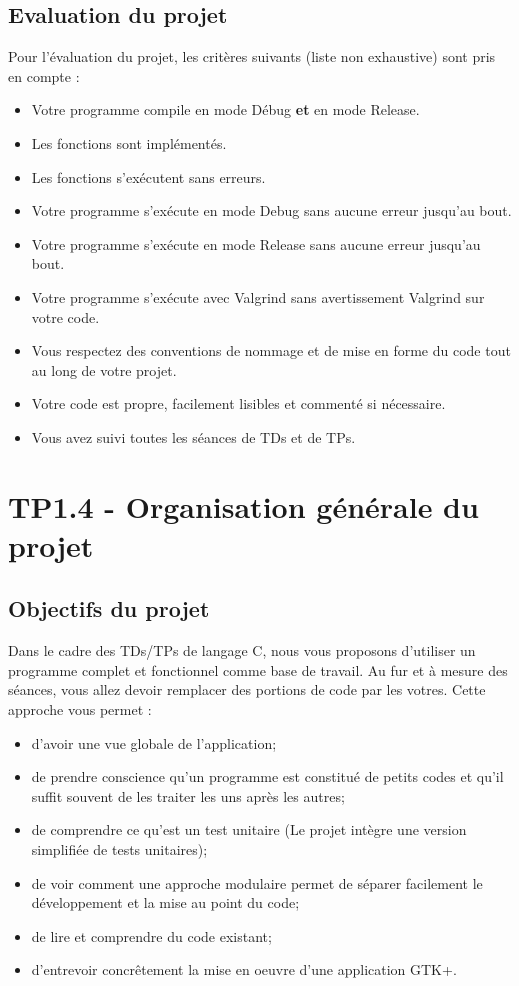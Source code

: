 \section{Evaluation du projet}

Pour l'évaluation du projet, les critères suivants (liste non exhaustive) sont pris en compte :
\begin{itemize}
  \item Votre programme compile en mode Débug \textbf{et} en mode Release.
  \item Les fonctions sont implémentés.
  \item Les fonctions s'exécutent sans erreurs.
  \item Votre programme s'exécute en mode Debug sans aucune erreur jusqu'au bout.
  \item Votre programme s'exécute en mode Release sans aucune erreur jusqu'au bout.
  \item Votre programme s'exécute avec Valgrind sans avertissement Valgrind sur votre code.
  \item Vous respectez des conventions de nommage et de mise en forme du code tout au long de votre projet.
  \item Votre code est \og{}propre\fg{}, facilement lisibles et commenté si nécessaire.
  \item Vous avez suivi toutes les séances de TDs et de TPs.
\end{itemize}


\chapter{TP1.4 - Organisation générale du projet}

\section{Objectifs du projet}

Dans le cadre des TDs/TPs de langage C, nous vous proposons d'utiliser un programme
complet et fonctionnel comme base de travail. Au fur et à mesure des séances,
vous allez devoir remplacer des portions de code par les votres. Cette approche
vous permet :
\begin{itemize}
  \item d'avoir une vue globale de l'application;
  \item de prendre conscience qu'un programme est constitué de \og petits\fg
  codes et qu'il suffit souvent de les traiter les uns après les autres;
  \item de comprendre ce qu'est un test unitaire (Le projet intègre une version
  simplifiée de tests unitaires);
  \item de voir comment une approche modulaire permet de séparer facilement le
  développement et la mise au point du code;
  \item de lire et comprendre du code existant;
  \item d'entrevoir concrêtement la mise en oeuvre d'une application GTK+.
\end{itemize}


